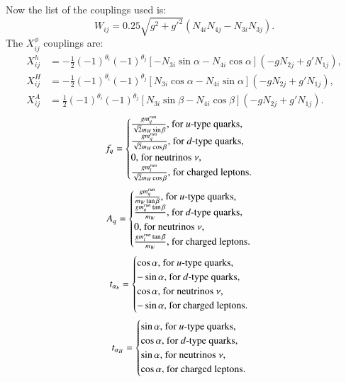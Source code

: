 \documentclass[final,3p,times,pdflatex]{elsarticle}
\begin{document}
Now the list of the couplings used is:
\begin{equation}
W_{ij} = 0.25\sqrt{g^2 + g'^2}(N_{4i}N_{4j}- N_{3i}N_{3j}).
\end{equation}
The $X_{ij}^{\phi}$ couplings are:
\begin{align}
X_{ij}^h &= -\frac{1}{2}(-1)^{\theta_i}(-1)^{\theta_j}[-N_{3i}\sin\alpha - N_{4i} \cos\alpha](-gN_{2j}+g'N_{1j}), \\
X_{ij}^H &= -\frac{1}{2}(-1)^{\theta_i}(-1)^{\theta_j}[N_{3i}\cos\alpha - N_{4i} \sin\alpha](-gN_{2j}+g'N_{1j}), \\ 
X_{ij}^A &= \frac{1}{2}(-1)^{\theta_i}(-1)^{\theta_j}[N_{3i}\sin\beta - N_{4i} \cos\beta](-gN_{2j}+g'N_{1j}).
\end{align}
\begin{equation}
f_{q} = \begin{cases}
{gm_{q}^{run} \over \sqrt{2} m_{W} \sin\beta}, $ for $u$-type quarks,$ \\
{gm_{q}^{run} \over \sqrt{2} m_{W} \cos\beta}, $ for $d$-type quarks,$ \\
0, $ for neutrinos $ \nu$,$ \\
{gm_{l}^{run} \over \sqrt{2} m_{W} \cos\beta}, $ for charged leptons$. \\
\end{cases}
\end{equation}
\begin{equation}
A_{q} = \begin{cases}
{g m_{q}^{run} \over m_{W} \tan\beta}, $ for $u$-type quarks,$ \\
{g m_{q}^{run} \tan\beta \over m_{W}}, $ for $d$-type quarks,$ \\
{0}, $ for neutrinos $ \nu$,$ \\
{g m_{l}^{run} \tan\beta \over m_{W}}, $ for charged leptons$. 
\end{cases}
\end{equation}
\begin{equation}
t_{\alpha_h} = \begin{cases}
\cos\alpha, $ for $u$-type quarks,$ \\
-\sin\alpha, $ for $d$-type quarks,$ \\
\cos\alpha, $ for neutrinos $ \nu$,$ \\
-\sin\alpha, $ for charged leptons$. 
\end{cases}
\end{equation}
\begin{equation}
t_{\alpha_H} = \begin{cases}
\sin\alpha, $ for $u$-type quarks,$ \\
\cos\alpha, $ for $d$-type quarks,$ \\
\sin\alpha, $ for neutrinos $ \nu$,$ \\
\cos\alpha, $ for charged leptons$. 
\end{cases}
\end{equation}
\end{document}
